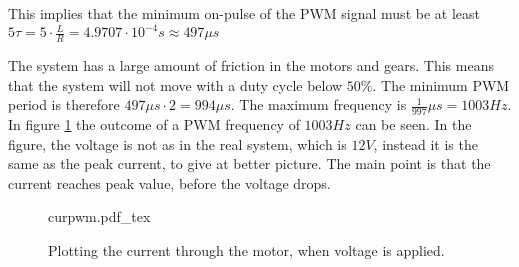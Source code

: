 \documentclass[../../../Main]{subfiles}
\begin{document}
This implies that the minimum on-pulse of the PWM signal must be at least $5\tau = 5 \cdot \frac{L}{R} = 4.9707 \cdot 10^{-4}s \approx 497\mu s$

The system has a large amount of friction in the motors and gears. This means that the system will not move with a duty cycle below $50\%$. The minimum PWM period is therefore $497\mu s \cdot 2 = 994\mu s$. The maximum frequency is $\frac{1}{997}\mu s = 1003 Hz$.
In figure \ref{fig:currentplot_pwm} the outcome of a PWM frequency of $1003Hz$ can be seen.
In the figure, the voltage is not as in the real system, which is $12V$, instead it is the same as the peak current, to give at better picture. The main point is that the current reaches peak value, before the voltage drops.

\begin{figure}[H]
\centering
\def\svgwidth{\textwidth}
{curpwm.pdf_tex}
\caption{Plotting the current through the motor, when voltage is applied.}
\label{fig:currentplot_pwm}
\end{figure}
\end{document}
